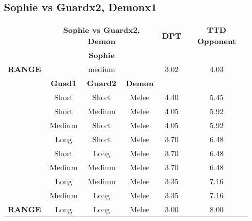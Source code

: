 \subsection{Sophie vs Guardx2, Demonx1}
\begin{table}[H]
\begin{tabular}{c|c|c|c|c|c|}
\cline{2-6}
\rowcolor[HTML]{C0C0C0} 
\cellcolor[HTML]{FFFFFF}\textbf{} & \multicolumn{3}{c|}{\cellcolor[HTML]{C0C0C0}\textbf{Sophie vs Guardx2, Demon}} & \textbf{DPT} & \textbf{TTD Opponent} \\ \cline{2-6} 
 & \multicolumn{3}{c|}{\textbf{Sophie}} & \multicolumn{2}{c|}{} \\ \hline
\multicolumn{1}{|c|}{\cellcolor[HTML]{C0C0C0}\textbf{RANGE}} & \multicolumn{3}{c|}{medium} & 3.02 & 4.03 \\ \hline
 & \textbf{Guad1} & \textbf{Guard2} & \textbf{Demon} & \multicolumn{2}{c|}{} \\ \hline
\multicolumn{1}{|c|}{\cellcolor[HTML]{C0C0C0}} & Short & Short & Melee & 4.40 & 5.45 \\ \cline{2-6} 
\multicolumn{1}{|c|}{\cellcolor[HTML]{C0C0C0}} & Short & Medium & Melee & 4.05 & 5.92 \\ \cline{2-6} 
\multicolumn{1}{|c|}{\cellcolor[HTML]{C0C0C0}} & Medium & Short & Melee & 4.05 & 5.92 \\ \cline{2-6} 
\multicolumn{1}{|c|}{\cellcolor[HTML]{C0C0C0}} & Long & Short & Melee & 3.70 & 6.48 \\ \cline{2-6} 
\multicolumn{1}{|c|}{\cellcolor[HTML]{C0C0C0}} & Short & Long & Melee & 3.70 & 6.48 \\ \cline{2-6} 
\multicolumn{1}{|c|}{\cellcolor[HTML]{C0C0C0}} & Medium & Medium & Melee & 3.70 & 6.48 \\ \cline{2-6} 
\multicolumn{1}{|c|}{\cellcolor[HTML]{C0C0C0}} & Long & Medium & Melee & 3.35 & 7.16 \\ \cline{2-6} 
\multicolumn{1}{|c|}{\cellcolor[HTML]{C0C0C0}} & Medium & Long & Melee & 3.35 & 7.16 \\ \cline{2-6} 
\multicolumn{1}{|c|}{\cellcolor[HTML]{C0C0C0}\textbf{RANGE}} & Long & Long & Melee & 3.00 & 8.00 \\ \hline
\end{tabular}
\end{table}

